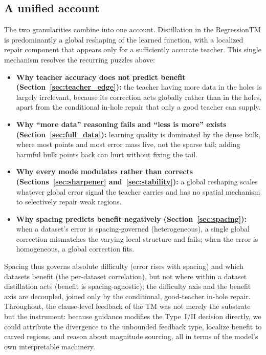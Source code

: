 \subsection{A unified account}
\label{sec:discussion}

The two granularities combine into one account. Distillation in the RegressionTM is
predominantly a global reshaping of the learned function, with a localized repair component
that appears only for a sufficiently accurate teacher. This single mechanism resolves the
recurring puzzles above:

\begin{itemize}
  \item \textbf{Why teacher accuracy does not predict benefit
    (Section~\ref{sec:teacher_edge}):} the teacher having more data in the holes is largely
    irrelevant, because its correction acts globally rather than in the holes, apart from
    the conditional in-hole repair that only a good teacher can supply.
  \item \textbf{Why ``more data'' reasoning fails and ``less is more'' exists
    (Section~\ref{sec:full_data}):} learning quality is dominated by the dense bulk, where
    most points and most error mass live, not the sparse tail; adding harmful bulk points
    back can hurt without fixing the tail.
  \item \textbf{Why every mode modulates rather than corrects
    (Sections~\ref{sec:sharpener} and~\ref{sec:stability}):} a global reshaping scales
    whatever global error signal the teacher carries and has no spatial mechanism to
    selectively repair weak regions.
  \item \textbf{Why spacing predicts benefit negatively (Section~\ref{sec:spacing}):} when
    a dataset's error is spacing-governed (heterogeneous), a single global correction
    mismatches the varying local structure and fails; when the error is homogeneous, a
    global correction fits.
\end{itemize}

Spacing thus governs absolute difficulty (error rises with spacing) and which datasets
benefit (the per-dataset correlation), but not where within a dataset distillation acts
(benefit is spacing-agnostic); the difficulty axis and the benefit axis are decoupled,
joined only by the conditional, good-teacher in-hole repair. Throughout, the clause-level feedback of the TM was not merely the substrate but the
instrument: because guidance modifies the Type~I/II decision directly, we could attribute
the divergence to the unbounded feedback type, localize benefit to carved regions, and
reason about magnitude sourcing, all in terms of the model's own interpretable machinery.

